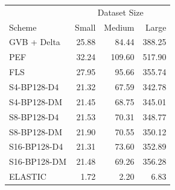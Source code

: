 \begin{tabular}{lrrr}
\toprule
 & \multicolumn{3}{c}{Dataset Size} \\
Scheme & Small & Medium & Large \\
\midrule
GVB + Delta & 25.88 & 84.44 & 388.25 \\
PEF & 32.24 & 109.60 & 517.90 \\
FLS & 27.95 & 95.66 & 355.74 \\
S4-BP128-D4 & 21.32 & 67.59 & 342.78 \\
S4-BP128-DM & 21.45 & 68.75 & 345.01 \\
S8-BP128-D4 & 21.53 & 70.31 & 348.77 \\
S8-BP128-DM & 21.90 & 70.55 & 350.12 \\
S16-BP128-D4 & 21.31 & 73.60 & 352.89 \\
S16-BP128-DM & 21.48 & 69.26 & 356.28 \\
ELASTIC & 1.72 & 2.20 & 6.83 \\
\bottomrule
\end{tabular}
